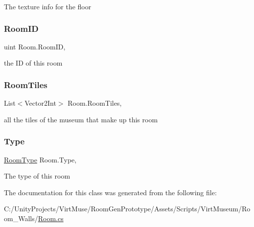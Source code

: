 The texture info for the floor 

\mbox{\label{class_room_a499df97242b8996b66cc22737159f59c}} 
\subsubsection{\texorpdfstring{Room\+ID}{RoomID}}
{\footnotesize\ttfamily uint Room.\+Room\+ID\hspace{0.3cm}{\ttfamily [get]}, {}}



the ID of this room 

\mbox{\label{class_room_aed67349f7f161cb2214111eff3e51018}} 
\subsubsection{\texorpdfstring{Room\+Tiles}{RoomTiles}}
{\footnotesize\ttfamily List$<$Vector2\+Int$>$ Room.\+Room\+Tiles\hspace{0.3cm}{\ttfamily [get]}, {}}



all the tiles of the museum that make up this room 

\mbox{\label{class_room_a55dc5c580ea31562a0aa6f11b4b8f462}} 
\subsubsection{\texorpdfstring{Type}{Type}}
{\footnotesize\ttfamily \mbox{\hyperlink{_room_8cs_ab540f7414f306325d92272bcef1e34e1}{Room\+Type}} Room.\+Type\hspace{0.3cm}{\ttfamily [get]}, {}}



The type of this room 



The documentation for this class was generated from the following file\+:\begin{DoxyCompactItemize}
\item 
C\+:/\+Unity\+Projects/\+Virt\+Muse/\+Room\+Gen\+Prototype/\+Assets/\+Scripts/\+Virt\+Museum/\+Room\+\_\+\+Walls/\mbox{\hyperlink{_room_8cs}{Room.\+cs}}\end{DoxyCompactItemize}
